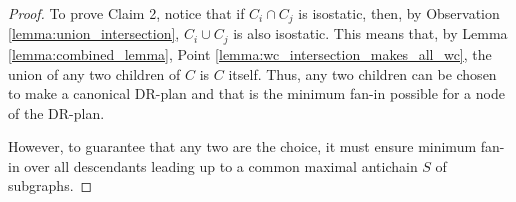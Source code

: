 \begin{proof}
    To prove Claim 2, notice that if $C_i\cap C_j$ is isostatic, then, by Observation \ref{lemma:union_intersection}, $C_i\cup C_j$ is also isostatic. This means that, by Lemma \ref{lemma:combined_lemma}, Point \ref{lemma:wc_intersection_makes_all_wc}, the union of any two children of $C$ is $C$ itself. Thus, any two children can be chosen to make a canonical DR-plan and that is the minimum fan-in possible for a node of the DR-plan.

    \newcommand{\induceonc}[1]{Idc\left(C,#1\right)}
    \renewcommand{\induceonc}[1]{#1}
    \newcommand{\iunion}[1]{\induceonc{I\cup\bigcup_{k\in [N]\setminus\{#1\}}{R_k}}}

    However, to guarantee that any two are the  choice, it must ensure minimum fan-in over all descendants leading up to a common maximal antichain $S$ of subgraphs.


\end{proof}
